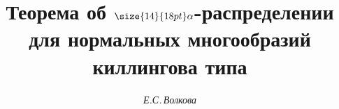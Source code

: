 









\newcommand{\im}{\operatorname{Im}}


\newcommand{\id}{\operatorname{id}}


\newcommand{\tts}[1]{}







\setcounter{page}{14}















\author{\it Е.С.\,Волкова}




\title{Теорема об $\size{14}{18pt}\selectfont\alpha$-распределении\\


для нормальных многообразий киллингова типа}





\date{}




\pagestyle{plain} %







\maketitle


